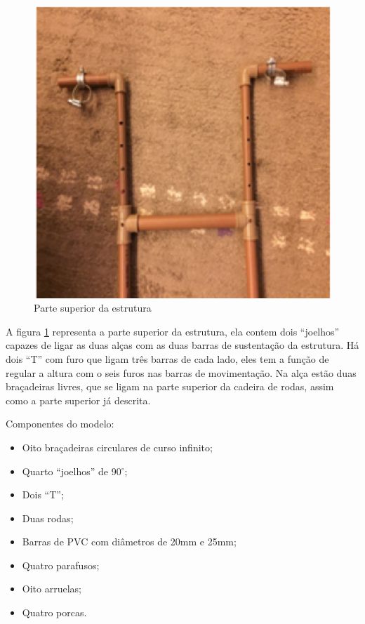 \begin{figure}[!htb]
\centering
\includegraphics[keepaspectratio=true,scale=0.4]{figuras/resultados/superior_estrutura}
\caption{Parte superior da estrutura}
\label{fig:superior_estrutura}
\end{figure}

A figura \ref{fig:superior_estrutura} representa a parte superior da estrutura, ela contem dois “joelhos” capazes de ligar as duas alças com as duas barras de sustentação da estrutura. Há dois “T” com furo que ligam três barras de cada lado, eles tem a função de regular a altura com o seis furos nas barras de movimentação. Na alça estão duas braçadeiras livres, que se ligam na parte superior da cadeira de rodas, assim como a parte superior já descrita.

Componentes do modelo:

\begin{itemize}
  \item Oito braçadeiras circulares de curso infinito;
  \item Quarto “joelhos” de 90$^\circ$;
  \item Dois “T”;
  \item Duas rodas;
  \item Barras de PVC com diâmetros de 20mm e 25mm;
  \item Quatro parafusos;
  \item Oito arruelas;
  \item Quatro porcas.
\end{itemize}

